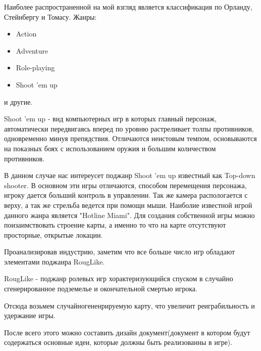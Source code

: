 \documentclass[14pt, titlepage,fleqn,a4paper]{extarticle}
\begin{document}
Наиболее распространенной на мой взгляд является классификация по Орланду, Стейнбергу и Томасу.
	Жанры:
	\begin{itemize}
		\item Action
		\item Adventure
		\item Role-playing
		\item Shoot 'em up
	\end{itemize}
	и другие.

Shoot 'em up - вид компьютерных игр в которых главный персонаж, автоматически передвигаясь вперед по уровню растреливает толпы противников, одновременно минуя препядствия. Отличаются неистовым темпом, основываются на показных боях с использованием оружия и большим количеством противников. 

В данном случае нас интереусет поджанр Shoot 'em up известный как Top-down shooter. В основном эти игры отличаются, способом перемещения персонажа, игроку дается больший контроль в управлении. Так же камера распологается с верху, а так же стрельба ведется при помощи мыши. Наиболие известной игрой данного жанра является "Hotline Miami". Для создания собственной игры можно поизаимствовать строение карты, а именно то что на карте отсутствуют просторные, открытые локации.

Проанализировав индустрию, заметим что все больше число игр обладают элементами поджанра RougLike.

RougLike - поджанр ролевых игр хорактеризующийся спуском в случайно сгенерированное подземелье и окончательной смертью игрока.

Отсюда возьмем случайногененрируемую карту, что увеличит реиграбильность и удержание игры.

После всего этого можно составить дизайн документ(документ в котором будут содержаться основные идеи, которые должны быть реализованны в игре).
\end{document}
